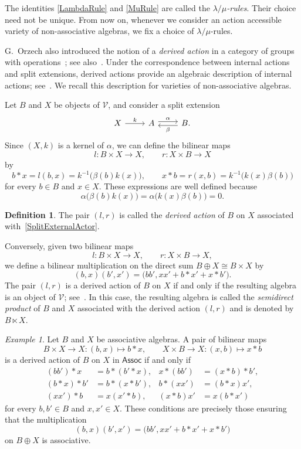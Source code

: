 \documentclass[reqno,a4paper]{amsart}
\theoremstyle{plain}
\theoremstyle{definition}
\newtheorem{definition}[subsection]{Definition}
\theoremstyle{remark}
\newtheorem{example}[subsection]{Example}
\numberwithin{equation}{section}
\newcommand{\V}{\mathcal{V}}
\newcommand{\Assoc}{\ensuremath{\mathsf{Assoc}}}
\begin{document}
The identities \eqref{LambdaRule} and \eqref{MuRule} are called the \emph{$\lambda/\mu$-rules}. Their choice need not be unique. From now on, whenever we consider an action accessible variety of non-associative algebras, we fix a choice of $\lambda/\mu$-rules.

G.~Orzech also introduced the notion of a \emph{derived action} in a category of groups with operations~\cite{Orzech}; see also~\cite{Datuashvili}. Under the correspondence between internal actions and split extensions, derived actions provide an algebraic description of internal actions; see~\cite[Theorem~3.17]{SurveyActions}. We recall this description for varieties of non-associative algebras.

Let $B$ and $X$ be objects of $\V$, and consider a split extension
\begin{equation}\label{SplitExternalActor}
\begin{tikzcd}
X \arrow[r, "k"]
&
A \arrow[r, shift left, "\alpha"]
&
B. \arrow[l, shift left, "\beta"]
\end{tikzcd}
\end{equation}
Since $(X,k)$ is a kernel of $\alpha$, we can define the bilinear maps
\[
l\colon B\times X\to X,
\qquad
r\colon X\times B\to X
\]
by
\[
b\ast x=l(b,x)=k^{-1}\bigl(\beta(b)k(x)\bigr),
\qquad
x\ast b=r(x,b)=k^{-1}\bigl(k(x)\beta(b)\bigr)
\]
for every $b\in B$ and $x\in X$. These expressions are well defined because
\[
\alpha\bigl(\beta(b)k(x)\bigr)=
\alpha\bigl(k(x)\beta(b)\bigr)=0.
\]

\begin{definition}
The pair $(l,r)$ is called the \emph{derived action} of $B$ on $X$ associated with~\eqref{SplitExternalActor}.
\end{definition}

Conversely, given two bilinear maps
\[
l\colon B\times X\to X,
\qquad
r\colon X\times B\to X,
\]
we define a bilinear multiplication on the direct sum $B\oplus X \cong B \times X$ by
\[
(b,x)(b',x')=\bigl(bb',xx'+b\ast x'+x\ast b'\bigr).
\]
The pair $(l,r)$ is a derived action of $B$ on $X$ if and only if the resulting algebra is an object of $\V$; see~\cite[Theorem~2.4]{Orzech}. In this case, the resulting algebra is called the \emph{semidirect product} of $B$ and $X$ associated with the derived action $(l,r)$ and is denoted by~$B\ltimes X$.

\begin{example}\label{ExampleDerivedAssoc}
Let $B$ and $X$ be associative algebras. A pair of bilinear maps
\[
B\times X\to X\colon(b,x)\mapsto b\ast x,
\qquad
X\times B\to X\colon(x,b)\mapsto x\ast b
\]
is a derived action of $B$ on $X$ in $\Assoc$ if and only if
\begin{align*}
(bb')\ast x&=b\ast(b'\ast x),&
x\ast(bb')&=(x\ast b)\ast b',\\
(b\ast x)\ast b'&=b\ast(x\ast b'),&
b\ast(xx')&=(b\ast x)x',\\
(xx')\ast b&=x(x'\ast b),&
(x\ast b)x'&=x(b\ast x')
\end{align*}
for every $b,b'\in B$ and $x,x'\in X$. These conditions are precisely those ensuring that the multiplication
\[
(b,x)(b',x')
=
\bigl(bb',xx'+b\ast x'+x\ast b'\bigr)
\]
on $B\oplus X$ is associative.
\end{example}
\end{document}
